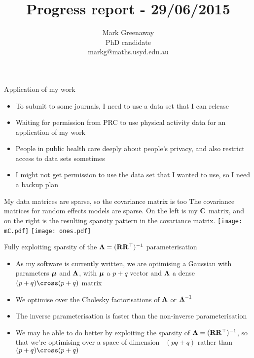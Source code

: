 \documentclass{beamer}
\title{Progress report - 29/06/2015}
\author{Mark Greenaway\\PhD candidate\\markg@maths.usyd.edu.au}
\begin{document}
\begin{frame}
\maketitle
\end{frame}

\begin{frame}{Application of my work}
\begin{itemize}
\item To submit to some journals, I need to use a data set that I can release
\item Waiting for permission from PRC to use physical activity data for an application
			of my work
\item People in public health care deeply about people's privacy, and also restrict access
			to data sets sometimes
\item I might not get permission to use the data set that I wanted to use, so I need a backup
			plan
\end{itemize}
\end{frame}

\begin{frame}{My data matrices are sparse, so the covariance matrix is too}
The covariance matrices for random effects models are sparse.
On the left is my ${\bf C}$ matrix, and on the right is the resulting sparsity pattern in the covariance
matrix.
\texttt{[image: mC.pdf]}
\texttt{[image: ones.pdf]}
\end{frame}

\begin{frame}{Fully exploiting sparsity of the ${\boldsymbol \Lambda} = ({\bf R} {\bf R}^\top)^{-1}$ parameterisation}
\begin{itemize}
\item As my software is currently written, we are optimising a Gaussian with parameters
			${\boldsymbol \mu}$ and ${\boldsymbol \Lambda}$, with ${\boldsymbol \mu}$ a $p + q$ vector and ${\boldsymbol \Lambda}$ a dense
			$(p + q) \cross (p + q)$ matrix
\item We optimise over the Cholesky factorisations of ${\boldsymbol \Lambda}$ or ${\boldsymbol \Lambda}^{-1}$
\item  The inverse parameterisation is faster than the non-inverse parameterisation
\item We may be able to do better by exploiting the sparsity of ${\boldsymbol \Lambda} = ({\bf R} {\bf R}^\top)^{-1}$, so
			that we're optimising over a space of dimension ~$(pq + q)$ rather than
			~$(p + q) \cross (p + q)$
\end{itemize}
\end{frame}
\end{document}
